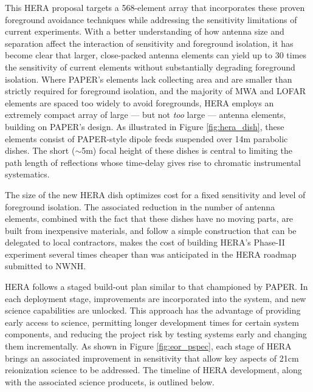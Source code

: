 \documentclass[preprint]{aastex}
\begin{document}
This HERA proposal targets a 568-element array that incorporates these proven
foreground avoidance techniques while addressing the sensitivity limitations of
current experiments.  With a better understanding of how antenna size and
separation affect the interaction of sensitivity and foreground isolation, it
has become clear that larger, close-packed antenna elements can yield up to 30
times the sensitivity of current elements without substantially degrading
foreground isolation.  Where PAPER’s elements lack collecting area and are
smaller than strictly required for foreground isolation, and the majority of
MWA and LOFAR elements are spaced too widely to avoid foregrounds, HERA employs
an extremely compact array of large --- but not {\it too} large --- antenna
elements, building on PAPER's design.  As illustrated in Figure
\ref{fig:hera_dish}, these elements consist of PAPER-style dipole feeds
suspended over 14m parabolic dishes.  The short ($\sim$5m) focal height of these
dishes is central to limiting the path length of reflections whose time-delay
gives rise to chromatic instrumental systematics. 

The size of the new HERA dish optimizes cost for a fixed sensitivity and level
of foreground isolation.  The associated reduction in the number of antenna
elements, combined with the fact that these dishes have no moving parts, are
built from inexpensive materials, and follow a simple construction that can be
delegated to local contractors, makes the cost of building HERA's Phase-II
experiment several times cheaper than was anticipated in the HERA roadmap
submitted to NWNH.  

HERA follows a staged build-out plan similar to that championed by PAPER.  In
each deployment stage, improvements are incorporated into the system, and new
science capabilities are unlocked.  This approach has the advantage of
providing early access to science, permitting longer development times for
certain system components, and reducing the project risk by testing systems
early and changing them incrementally.  As shown in Figure \ref{fig:eor_pspec}, each
stage of HERA brings an associated improvement in sensitivity that allow key
aspects of 21cm reionization science to be addressed.  The timeline of HERA
development, along with the associated science producets, is outlined below. 
\end{document}
